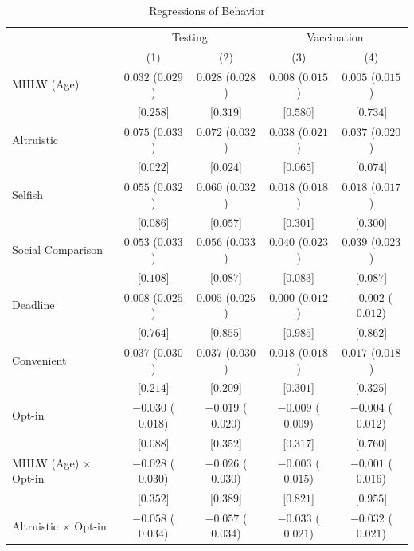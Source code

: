 \documentclass[
      12pt,
    a4paper
]{article}
\begin{document}
\begin{table}

\caption{\label{tab:reg-act}Regressions of Behavior}
\centering
\fontsize{9}{11}\selectfont
\begin{threeparttable}
\begin{tabular}[t]{lcccc}
\toprule
\multicolumn{1}{c}{ } & \multicolumn{2}{c}{Testing} & \multicolumn{2}{c}{Vaccination} \\
\cmidrule(l{3pt}r{3pt}){2-3} \cmidrule(l{3pt}r{3pt}){4-5}
  & (1) & (2) & (3) & (4)\\
\midrule
MHLW (Age) & $0.032$ ($0.029$) & $0.028$ ($0.028$) & $0.008$ ($0.015$) & $0.005$ ($0.015$)\\
 & {}[$0.258$] & {}[$0.319$] & {}[$0.580$] & {}[$0.734$]\\
Altruistic & $0.075$ ($0.033$) & $0.072$ ($0.032$) & $0.038$ ($0.021$) & $0.037$ ($0.020$)\\
 & {}[$0.022$] & {}[$0.024$] & {}[$0.065$] & {}[$0.074$]\\
Selfish & $0.055$ ($0.032$) & $0.060$ ($0.032$) & $0.018$ ($0.018$) & $0.018$ ($0.017$)\\
 & {}[$0.086$] & {}[$0.057$] & {}[$0.301$] & {}[$0.300$]\\
Social Comparison & $0.053$ ($0.033$) & $0.056$ ($0.033$) & $0.040$ ($0.023$) & $0.039$ ($0.023$)\\
 & {}[$0.108$] & {}[$0.087$] & {}[$0.083$] & {}[$0.087$]\\
Deadline & $0.008$ ($0.025$) & $0.005$ ($0.025$) & $0.000$ ($0.012$) & $-0.002$ ($0.012$)\\
 & {}[$0.764$] & {}[$0.855$] & {}[$0.985$] & {}[$0.862$]\\
Convenient & $0.037$ ($0.030$) & $0.037$ ($0.030$) & $0.018$ ($0.018$) & $0.017$ ($0.018$)\\
 & {}[$0.214$] & {}[$0.209$] & {}[$0.301$] & {}[$0.325$]\\
Opt-in & $-0.030$ ($0.018$) & $-0.019$ ($0.020$) & $-0.009$ ($0.009$) & $-0.004$ ($0.012$)\\
 & {}[$0.088$] & {}[$0.352$] & {}[$0.317$] & {}[$0.760$]\\
MHLW (Age) $\times$ Opt-in & $-0.028$ ($0.030$) & $-0.026$ ($0.030$) & $-0.003$ ($0.015$) & $-0.001$ ($0.016$)\\
 & {}[$0.352$] & {}[$0.389$] & {}[$0.821$] & {}[$0.955$]\\
Altruistic $\times$ Opt-in & $-0.058$ ($0.034$) & $-0.057$ ($0.034$) & $-0.033$ ($0.021$) & $-0.032$ ($0.021$)\\

\end{tabular}
\end{threeparttable}
\end{table}
\end{document}

